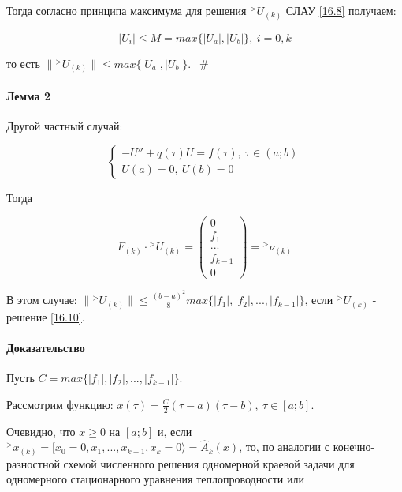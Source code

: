 \documentclass[__main__.tex]{subfiles}
\begin{document}
Тогда согласно принципа максимума для решения ${}^> U_{\left(k\right)}$ СЛАУ \ref{16.8} получаем:

$$
\left|U_i\right| \leq M = max \{ \left|U_a\right|, \left|U_b\right| \}, \ i = \overline{0,k}
$$

то есть $\| {}^> U_{\left(k\right)} \| \leq max \{ \left|U_a\right|, \left|U_b\right| \}$. $\ \ \# $

\paragraph{Лемма 2}

Другой частный случай:

\begin{equation}\label{16.9}
\begin{cases}
-U''+q\left(\tau\right) U = f\left(\tau\right), \ \tau \in \left(a;b\right) \\
U\left(a\right) = 0, \ U\left(b\right) = 0
\end{cases}
\end{equation}

Тогда 

\begin{equation}\label{16.10}
F_{\left(k\right)} \cdot {}^>U_{\left(k\right)} = \left(
\begin{matrix}
0 \\ f_1 \\ ... \\ f_{k-1} \\ 0
\end{matrix}
\right) = {}^>\nu_{\left(k\right)}
\end{equation}

В этом случае: $\| {}^> U_{\left(k\right)} \| \leq \frac{\left(b-a\right)^2}{8} max \{ \left|f_1\right|, \left|f_2\right|, ..., \left|f_{k-1}\right| \}$, если ${}^>U_{\left(k\right)}$ - решение \ref{16.10}.

\paragraph{Доказательство}

Пусть $C = max \{\left|f_1\right|,\left|f_2\right|,...,\left|f_{k-1}\right|\}$.

Рассмотрим функцию: $x\left(\tau\right) = \frac{C}{2} \left(\tau - a\right) \left(\tau - b\right), \ \tau \in [a;b]$.

Очевидно, что $x\geq 0$ на $[a;b]$ и, если ${}^> x_{\left(k\right)} = [ x_0 = 0, x_1, ..., x_{k-1}, x_k = 0 \rangle = \hat{A}_k \left(x\right)$, то, по аналогии с конечно-разностной схемой численного решения одномерной краевой задачи для одномерного стационарного уравнения теплопроводности или
\end{document}
